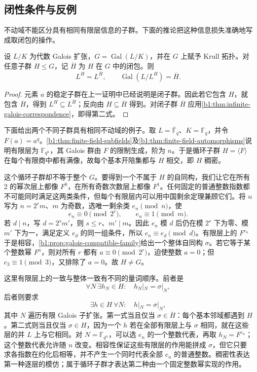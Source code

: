 \subsection{闭性条件与反例}
\label{b1:subsec:2203:02}
不动域不能区分具有相同有限层信息的子群。下面的推论把这种信息损失准确地写成取闭包的操作。

\begin{corollary}\label{b1:cor:fixed-field-closure}
	设 \(L/K\) 为代数 Galois 扩张，\(G=\operatorname{Gal}(L/K)\)，并在 \(G\) 上赋予 Krull 拓扑。对任意子群 \(H\leq G\)，记 \(\overline H\) 为 \(H\) 在 \(G\) 中的闭包。则
	\[
		L^H=L^{\overline H},\qquad \operatorname{Gal}(L/L^H)=\overline H.
	\]
\end{corollary}
\begin{proof}
	元素 \(a\) 的稳定子群在上一证明中已经说明是闭子群。因此若它包含 \(H\)，就包含 \(\overline H\)，得到 \(L^H\subseteq L^{\overline H}\)；反向由 \(H\subseteq\overline H\) 得到。对闭子群 \(\overline H\) 应用\cref{b1:thm:infinite-galois-correspondence}，即得第二式。
\end{proof}
下面给出两个不同子群具有相同不动域的例子。取 \(L=\overline{\mathbb F}_q\)、\(K=\mathbb F_q\)，并令 \(F(a)=a^q\)。\cref{b1:thm:finite-field-subfields}及\cref{b1:thm:finite-field-automorphisms}说明有限层为 \(\mathbb F_{q^n}\)，其 Galois 群由 \(F\) 的限制生成，阶为 \(n\)。于是循环子群 \(H=\langle F\rangle\) 在每个有限商中都有满像，故每个基本开陪集都与 \(H\) 相交，即 \(H\) 稠密。

\ProseParagraphBreak
这个循环子群却不等于整个 \(G\)。要得到一个不属于 \(H\) 的自同构，我们让它在所有 \(2\) 的幂次层上都像 \(F^0\)，在所有奇数次数层上都像 \(F^1\)。任何固定的普通整数指数都不可能同时满足这两类条件，但每个有限层内可以用中国剩余定理兼顾它们。将 \(n\) 写为 \(n=2^r m\)、\(m\) 为奇数，选唯一剩余类 \(e_n\pmod n\)，使
\[
	e_n\equiv0\pmod{2^r},\qquad e_n\equiv1\pmod m.
\]
若 \(d\mid n\)，写 \(d=2^s m'\)，则 \(s\le r\)、\(m'\mid m\)。因此 \(e_n\) 模 \(d\) 后仍在模 \(2^s\) 下为零、模 \(m'\) 下为一，满足定义 \(e_d\) 的同一组条件，所以 \(e_n\equiv e_d\pmod d\)。有限层上的 \(F^{e_n}\) 于是相容，\cref{b1:prop:galois-compatible-family}给出一个整体自同构 \(\sigma\)。若它等于某个整数幂 \(F^a\)，则对所有 \(r\) 都有 \(a\equiv0\pmod{2^r}\)，迫使整数 \(a=0\)；但 \(e_3\equiv1\pmod3\)，又排除了 \(a=0\)。故 \(H\ne G\)。

\ProseParagraphBreak
这里有限层上的一致与整体一致有不同的量词顺序。前者是
\[
	\forall N\ \exists h_N\in H:\quad h_N|_N=\sigma|_N,
\]
后者则要求
\[
	\exists h\in H\ \forall N:\quad h|_N=\sigma|_N,
\]
其中 \(N\) 遍历有限 Galois 子扩张。第一式当且仅当 \(\sigma\in\overline H\)：每个基本邻域都遇到 \(H\)。第二式则当且仅当 \(\sigma\in H\)，因为一个 \(h\) 若在全部有限层上与 \(\sigma\) 相同，就在这些层的并 \(L\) 上与它相同。对 \(N=\mathbb F_{q^n}\)，可以选 \(e_n\) 的一个整数代表，再取 \(h_N=F^{e_n}\)；这个整数代表允许随 \(n\) 改变。相容性保证这些有限层的作用能拼成 \(\sigma\)，但它只要求各指数在约化后相等，并不产生一个同时代表全部 \(e_n\) 的普通整数。稠密性表达第一种逐层的模仿；属于循环子群才表达第二种由一个固定整数幂实现的作用。

